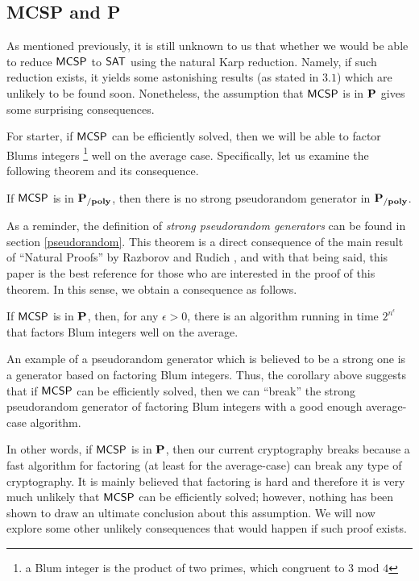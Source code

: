 \documentclass[11pt]{article}
\begin{document}
\subsection{MCSP and P}
As mentioned previously, it is still unknown to us that whether we would be able to reduce $\mathprob{MCSP}$ to $\mathprob{SAT}$ using the natural Karp reduction. Namely, if such reduction exists, it yields some astonishing results (as stated in $3.1$) which are unlikely to be found soon. Nonetheless, the assumption that $\mathprob{MCSP}$ is in $\P$ gives some surprising consequences. 

For starter, if $\mathprob{MCSP}$ can be efficiently solved, then we will be able to factor Blums integers \footnote{a Blum integer is the product of two primes, which congruent to $3$ mod $4$} well on the average case. Specifically, let us examine the following theorem and its consequence.

\begin{theorem}
	If $\mathprob{MCSP}$ is in $\Ppoly$, then there is no strong pseudorandom generator in $\Ppoly$.
\end{theorem}

As a reminder, the definition of \textit{strong pseudorandom generators} can be found in section \ref{pseudorandom}. This theorem is a direct consequence of the main result of ``Natural Proofs'' by Razborov and Rudich \cite{10.1006/jcss.1997.1494}, and with that being said, this paper is the best reference for those who are interested in the proof of this theorem. In this sense, we obtain a consequence as follows.

\begin{corollary}
	If $\mathprob{MCSP}$ is in $\P$, then, for any $\epsilon > 0$, there is an algorithm running in time $2^{n^{\epsilon}}$ that factors Blum integers well on the average.
\end{corollary}

An example of a pseudorandom generator which is believed to be a strong one is a generator based on factoring Blum integers. Thus, the corollary above suggests that if $\mathprob{MCSP}$ can be efficiently solved, then we can ``break'' the strong pseudorandom generator of factoring Blum integers with a good enough average-case algorithm.  

In other words, if $\mathprob{MCSP}$ is in $\P$, then our current cryptography breaks because a fast algorithm for factoring (at least for the average-case) can break any type of cryptography. It is mainly believed that factoring is hard and therefore it is very much unlikely that $\mathprob{MCSP}$ can be efficiently solved; however, nothing has been shown to draw an ultimate conclusion about this assumption. We will now explore some other unlikely consequences that would happen if such proof exists.
\end{document}
